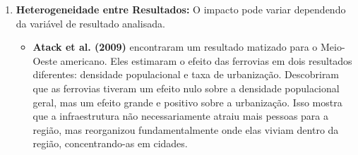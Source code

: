 \documentclass[12pt, a4paper]{article}
\begin{document}
\begin{enumerate}[label=\arabic*.]
    \item \textbf{Heterogeneidade entre Resultados:} O impacto pode variar dependendo da variável de resultado analisada.
    \begin{itemize}
        \item \textbf{Atack et al. (2009)} encontraram um resultado matizado para o Meio-Oeste americano. Eles estimaram o efeito das ferrovias em dois resultados diferentes: densidade populacional e taxa de urbanização. Descobriram que as ferrovias tiveram um efeito nulo sobre a densidade populacional geral, mas um efeito grande e positivo sobre a urbanização. Isso mostra que a infraestrutura não necessariamente atraiu mais pessoas para a região, mas reorganizou fundamentalmente onde elas viviam dentro da região, concentrando-as em cidades.
    \end{itemize}
\end{enumerate}
\end{document}
